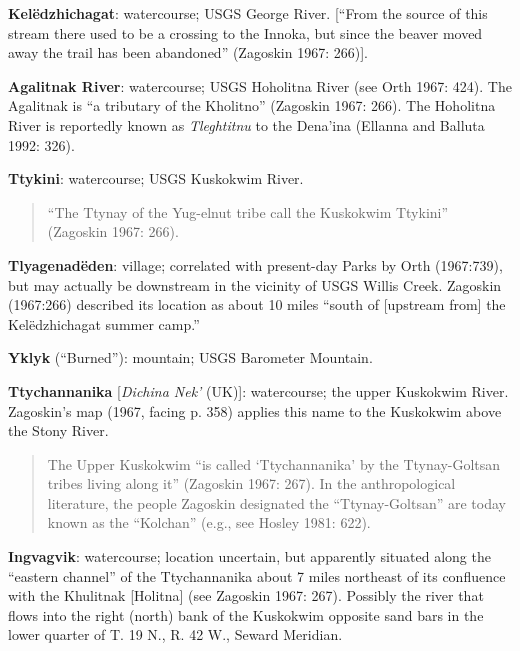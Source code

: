 \begin{hang}
\textbf{Kelëdzhichagat}: watercourse; USGS George River. [“From the source of this stream there used to be a crossing to the Innoka, but since the beaver moved away the trail has been abandoned” (Zagoskin 1967: 266)].



\textbf{Agalitnak River}: watercourse; USGS Hoholitna River (see Orth 1967: 424). The Agalitnak is “a tributary of the Kholitno” (Zagoskin 1967: 266). The Hoholitna River is reportedly known as \textit{Tleghtitnu} to the Dena’ina (Ellanna and Balluta 1992: 326).



\textbf{Ttykini}: watercourse; USGS Kuskokwim River.



\begin{quote}“The Ttynay of the Yug-elnut tribe call the Kuskokwim Ttykini” (Zagoskin 1967: 266).
\end{quote}



\textbf{Tlyagenadëden}: village; correlated with present-day Parks by Orth (1967:739), but may actually be downstream in the vicinity of USGS Willis Creek. Zagoskin (1967:266) described its location as about 10 miles “south of [upstream from] the Kelëdzhichagat summer camp.”



\textbf{Yklyk} (“Burned”): mountain; USGS Barometer Mountain.



\textbf{Ttychannanika} [\textit{Dichina Nek’} (UK)]: watercourse; the upper Kuskokwim River. Zagoskin’s map (1967, facing p. 358) applies this name to the Kuskokwim above the Stony River.



\begin{quote}The Upper Kuskokwim “is called ‘Ttychannanika’ by the Ttynay-Goltsan tribes living along it” (Zagoskin 1967: 267). In the anthropological literature, the people Zagoskin designated the “Ttynay-Goltsan” are today known as the “Kolchan” (e.g., see Hosley 1981: 622).
\end{quote}



\textbf{Ingvagvik}: watercourse; location uncertain, but apparently situated along the “eastern channel” of the Ttychannanika about 7 miles northeast of its confluence with the Khulitnak [Holitna] (see Zagoskin 1967: 267). Possibly the river that flows into the right (north) bank of the Kuskokwim opposite sand bars in the lower quarter of T. 19 N., R. 42 W., Seward Meridian.



\end{hang}

